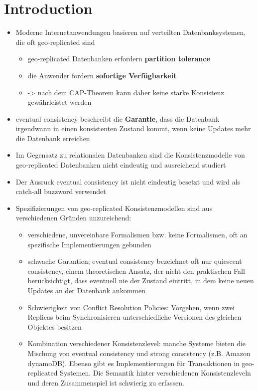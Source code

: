 \documentclass[11pt,a4paper,ngerman]{scrartcl}
\begin{document}
\section{Introduction}
\begin{itemize}
\item Moderne Internetanwendungen basieren auf verteilten Datenbanksystemen, die oft \gls{geo-replicated} sind
\begin{itemize}
\item \gls{geo-replicated} Datenbanken erfordern \textbf{partition tolerance}
\item die Anwender fordern \textbf{sofortige Verfügbarkeit}
\item -> nach dem CAP-Theorem kann daher keine starke Konsistenz gewährleistet werden
\end{itemize}
\item \gls{eventual consistency} beschreibt die \textbf{Garantie}, dass die Datenbank irgendwann in einen konsistenten Zustand kommt, wenn keine Updates mehr die Datenbank erreichen
\item Im Gegensatz zu relationalen Datenbanken sind die Konsistenzmodelle von \gls{geo-replicated} Datenbanken nicht eindeutig und ausreichend studiert
\item Der Ausruck \gls{eventual consistency} ist nicht eindeutig besetzt und wird als catch-all buzzword verwendet
\item Spezifizierungen von \gls{geo-replicated} Konsistenzmodellen sind aus verschiedenen Gründen unzureichend:
\begin{itemize}
\item verschiedene, unvereinbare Formalismen bzw. keine Formalismen, oft an spezifische Implementierungen gebunden
\item schwache Garantien; \gls{eventual consistency} bezeichnet oft nur \gls{quiescent consistency}, einem theoretischen Ansatz, der nicht den praktischen Fall berücksichtigt, dass eventuell nie der Zustand eintritt, in dem keine neuen Updates an der Datenbank ankommen
\item Schwierigkeit von Conflict Resolution Policies: Vorgehen, wenn zwei Replicas beim Synchronisieren unterschiedliche Versionen des gleichen Objektes besitzen
\item Kombination verschiedener Konsistenzlevel: manche Systeme bieten die Mischung von \gls{eventual consistency} und strong consistency (z.B. Amazon dynamoDB). Ebenso gibt es Implementierungen für Transaktionen in \gls{geo-replicated} Systemen. Die Semantik hinter verschiedenen Konsistenzleveln und deren Zusammenspiel ist schwierig zu erfassen.

\end{itemize}
\end{itemize}
\end{document}
